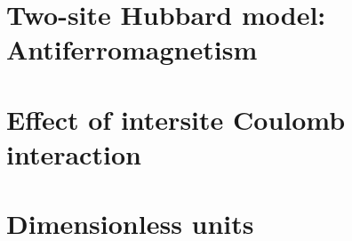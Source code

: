 








\section{Two-site Hubbard model: Antiferromagnetism}


\section{Effect of intersite Coulomb interaction}


\section{Dimensionless units}



